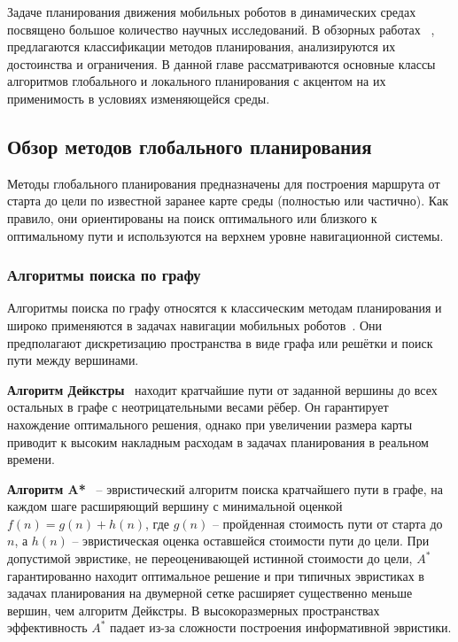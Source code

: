 \documentclass[a4paper,12pt]{extarticle}
\begin{document}
    Задаче планирования движения мобильных роботов в динамических средах
    посвящено большое количество научных исследований.
    В обзорных работах ~\cite{general, global_planing, tree_algorithms},
    предлагаются классификации методов планирования, анализируются их достоинства и ограничения.
    В данной главе рассматриваются основные классы алгоритмов глобального и
    локального планирования с акцентом на их применимость в условиях изменяющейся среды.

    \subsection{Обзор методов глобального планирования}
    Методы глобального планирования предназначены для построения маршрута от старта до цели по известной заранее карте среды (полностью или частично).
    Как правило, они ориентированы на поиск оптимального или
    близкого к оптимальному пути и используются на верхнем уровне навигационной системы.

    \subsubsection{Алгоритмы поиска по графу}
    Алгоритмы поиска по графу относятся к классическим методам планирования и
    широко применяются в задачах навигации мобильных роботов~\cite{tree_algorithms}.
    Они предполагают дискретизацию пространства в виде графа или решётки и поиск пути между вершинами.

    \textbf{Алгоритм Дейкстры}~\cite{dijkstra} находит кратчайшие пути от заданной вершины до всех остальных в графе с неотрицательными весами рёбер.
    Он гарантирует нахождение оптимального решения, однако при увеличении размера карты приводит к высоким накладным расходам в задачах планирования в реальном времени.

    \textbf{Алгоритм A*}~\cite{Astar} -- эвристический алгоритм поиска кратчайшего пути в графе, на каждом шаге расширяющий вершину с минимальной оценкой $f(n) = g(n) + h(n)$, где $g(n)$ -- пройденная стоимость пути от старта до $n$, а $h(n)$ -- эвристическая оценка оставшейся стоимости пути до цели.
    При допустимой эвристике, не переоценивающей истинной стоимости до цели, $A^*$ гарантированно находит оптимальное решение и при типичных эвристиках в задачах планирования на двумерной сетке расширяет существенно меньше вершин, чем алгоритм Дейкстры.
    В высокоразмерных пространствах эффективность $A^*$ падает из-за сложности построения информативной эвристики.
\end{document}
